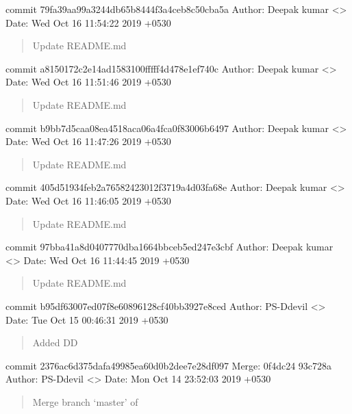 \documentclass[letterpaper,10pt,english]{sphinxmanual}
\begin{document}
commit 79fa39aa99a3244db65b8444f3a4ceb8c50cba5a
Author: Deepak kumar \textless{}\textgreater{}
Date:   Wed Oct 16 11:54:22 2019 +0530
\begin{quote}

Update README.md
\end{quote}

commit a8150172c2e14ad1583100fffff4d478e1ef740c
Author: Deepak kumar \textless{}\textgreater{}
Date:   Wed Oct 16 11:51:46 2019 +0530
\begin{quote}

Update README.md
\end{quote}

commit b9bb7d5caa08ea4518aca06a4fca0f83006b6497
Author: Deepak kumar \textless{}\textgreater{}
Date:   Wed Oct 16 11:47:26 2019 +0530
\begin{quote}

Update README.md
\end{quote}

commit 405d51934feb2a76582423012f3719a4d03fa68e
Author: Deepak kumar \textless{}\textgreater{}
Date:   Wed Oct 16 11:46:05 2019 +0530
\begin{quote}

Update README.md
\end{quote}

commit 97bba41a8d0407770dba1664bbceb5ed247e3cbf
Author: Deepak kumar \textless{}\textgreater{}
Date:   Wed Oct 16 11:44:45 2019 +0530
\begin{quote}

Update README.md
\end{quote}

commit b95df63007ed07f8e60896128cf40bb3927e8ced
Author: PS-Ddevil \textless{}\textgreater{}
Date:   Tue Oct 15 00:46:31 2019 +0530
\begin{quote}

Added DD
\end{quote}

commit 2376ac6d375dafa49985ea60d0b2dee7e28df097
Merge: 0f4dc24 93c728a
Author: PS-Ddevil \textless{}\textgreater{}
Date:   Mon Oct 14 23:52:03 2019 +0530
\begin{quote}

Merge branch ‘master’ of 
\end{quote}
\end{document}
